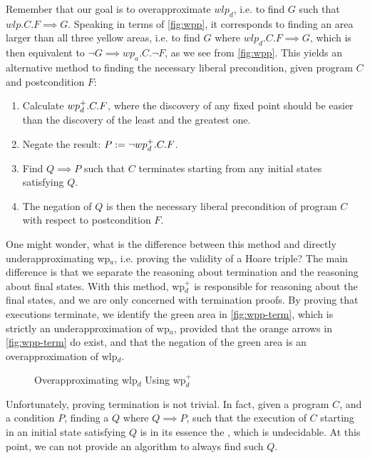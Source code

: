 Remember that our goal is to overapproximate $wlp_d$, i.e. to find $G$ such that $wlp.C.F\implies G$.
Speaking in terms of \autoref{fig:wpp}, it corresponds to finding an area larger than all three yellow areas, i.e. to find $G$ where $wlp_d.C.F\implies G$, which is then equivalent to $\neg G \implies wp_a.C.\neg F$, as we see from \autoref{fig:wpp}. 
This yields an alternative method to finding the necessary liberal precondition, given program $C$ and postcondition $F$:
\begin{enumerate}
	\item Calculate $wp_d^+.C.F$, where the discovery of any fixed point should be easier than the discovery of the least and the greatest one. 
	\item Negate the result: $P:=\neg wp_d^+.C.F $.
	\item Find $Q\implies P$ such that $C$  terminates starting from any initial states satisfying $Q$.  
	\item The negation of $Q$ is then the necessary liberal precondition of program $C$ with respect to postcondition $F$.
\end{enumerate}

One might wonder, what is the difference between this method and directly underapproximating wp$_a$, i.e. proving the validity of a Hoare triple? 
The main difference is that we separate the reasoning about termination and the reasoning about final states.%
With this method, wp$_d^+$ is responsible for reasoning about the final states, and we are only concerned with termination proofs. 
By proving that  executions terminate, we identify the green area in \autoref{fig:wpp-term}, which is strictly an underapproximation of wp$_a$, provided that the orange arrows in \autoref{fig:wpp-term} do exist, and that the negation of the green area is an overapproximation of wlp$_d$. 

\begin{figure}[ht]
	\centering
	
	\caption{Overapproximating wlp$_d$ Using wp$_d^+$}
	\label{fig:wpp-term}
\end{figure}

Unfortunately, proving termination is not trivial. 
In fact, given a program $C$, and a condition $P$, finding a $Q$ where $Q\implies P$, such that the execution of $C$ starting in an initial state satisfying $Q$ is in its essence the , which is undecidable. 
At this point, we can not provide an algorithm to always find such $Q$. 

